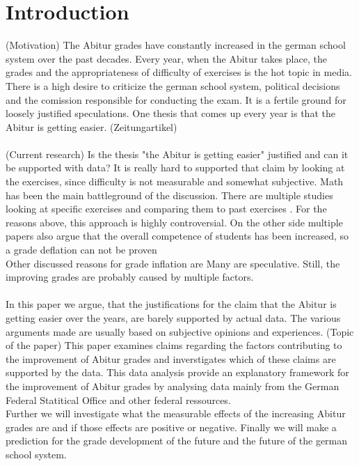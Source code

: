 \section{Introduction}
(Motivation)
The Abitur grades have constantly increased in the german school system over the past decades. Every year, when the Abitur takes place, the grades and the appropriateness of difficulty of exercises is the hot topic in media. \\
There is a high desire to criticize the german school system, political decisions and the comission responsible for conducting the exam. It is a fertile ground for loosely justified speculations. One thesis that comes up every year is that the Abitur is getting easier. (Zeitungartikel)\\\\
(Current research)
Is the thesis "the Abitur is getting easier" justified and can it be supported with data? It is really hard to supported that claim by looking at the exercises, since difficulty is not measurable and somewhat subjective. Math has been the main battleground of the discussion. There are multiple studies looking at specific exercises and comparing them to past exercises \cite{kuhnel2015modellierungskompetenz} \cite{JahnkeKleinKühnelSonarSpindler+2014+115+122} \cite{lemmermeyer2019zentralabitur}. For the reasons above, this approach is highly controversial. On the other side multiple papers also argue that the overall competence of students has been increased, so a grade deflation can not be proven \cite{Schleithoff+2015+3+26}\\ Other discussed reasons for grade inflation are Many are speculative. Still, the improving grades are probably caused by multiple factors.\\\\
In this paper we argue, that the justifications for the claim that the Abitur is getting easier over the years, are barely supported by actual data. The various arguments made are usually based on subjective opinions and experiences.
(Topic of the paper)
This paper examines claims regarding the factors contributing to the improvement of Abitur grades and inverstigates which of these claims are supported by the data. This data analysis provide an explanatory framework for the improvement of Abitur grades by analysing data mainly from the German Federal Statitical Office and other federal ressources.\\
Further we will investigate what the measurable effects of the increasing Abitur grades are and if those effects are positive or negative. Finally we will make a prediction for the grade development of the future and the future of the german school system.
